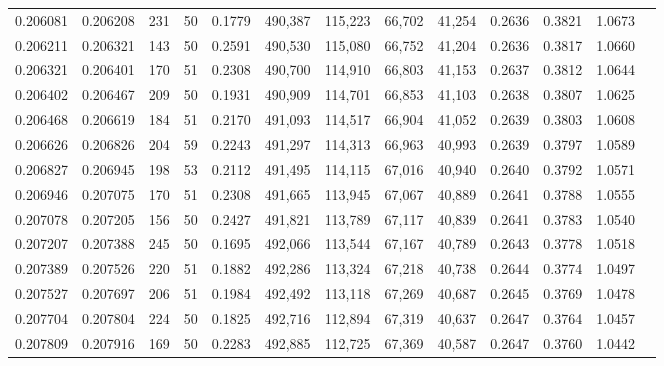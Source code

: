 \begin{tabular}{rrrrrrrrrrrrr}
0.206081 & 0.206208 &   231 &  50 &                                     0.1779 & 490,387 & 115,223 &  66,702 &  41,254 & 0.2636 & 0.3821 & 1.0673 \\
0.206211 & 0.206321 &   143 &  50 &                                     0.2591 & 490,530 & 115,080 &  66,752 &  41,204 & 0.2636 & 0.3817 & 1.0660 \\
0.206321 & 0.206401 &   170 &  51 &                                     0.2308 & 490,700 & 114,910 &  66,803 &  41,153 & 0.2637 & 0.3812 & 1.0644 \\
0.206402 & 0.206467 &   209 &  50 &                                     0.1931 & 490,909 & 114,701 &  66,853 &  41,103 & 0.2638 & 0.3807 & 1.0625 \\
0.206468 & 0.206619 &   184 &  51 &                                     0.2170 & 491,093 & 114,517 &  66,904 &  41,052 & 0.2639 & 0.3803 & 1.0608 \\
0.206626 & 0.206826 &   204 &  59 &                                     0.2243 & 491,297 & 114,313 &  66,963 &  40,993 & 0.2639 & 0.3797 & 1.0589 \\
0.206827 & 0.206945 &   198 &  53 &                                     0.2112 & 491,495 & 114,115 &  67,016 &  40,940 & 0.2640 & 0.3792 & 1.0571 \\
0.206946 & 0.207075 &   170 &  51 &                                     0.2308 & 491,665 & 113,945 &  67,067 &  40,889 & 0.2641 & 0.3788 & 1.0555 \\
0.207078 & 0.207205 &   156 &  50 &                                     0.2427 & 491,821 & 113,789 &  67,117 &  40,839 & 0.2641 & 0.3783 & 1.0540 \\
0.207207 & 0.207388 &   245 &  50 &                                     0.1695 & 492,066 & 113,544 &  67,167 &  40,789 & 0.2643 & 0.3778 & 1.0518 \\
0.207389 & 0.207526 &   220 &  51 &                                     0.1882 & 492,286 & 113,324 &  67,218 &  40,738 & 0.2644 & 0.3774 & 1.0497 \\
0.207527 & 0.207697 &   206 &  51 &                                     0.1984 & 492,492 & 113,118 &  67,269 &  40,687 & 0.2645 & 0.3769 & 1.0478 \\
0.207704 & 0.207804 &   224 &  50 &                                     0.1825 & 492,716 & 112,894 &  67,319 &  40,637 & 0.2647 & 0.3764 & 1.0457 \\
0.207809 & 0.207916 &   169 &  50 &                                     0.2283 & 492,885 & 112,725 &  67,369 &  40,587 & 0.2647 & 0.3760 & 1.0442 \\

\end{tabular}
